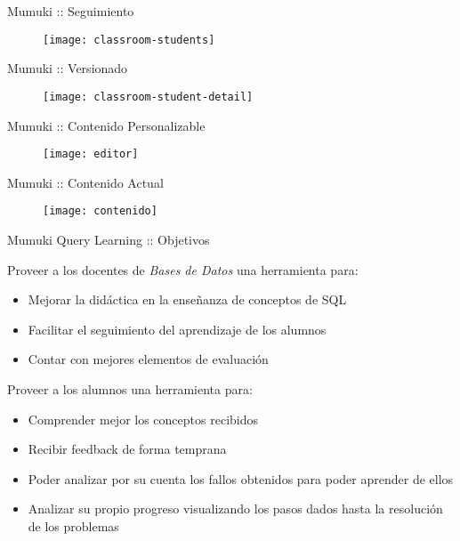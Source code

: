 \documentclass{beamer}
\begin{document}
\begin{frame}{Mumuki :: Seguimiento}
    \begin{figure}[h]
        \texttt{[image: classroom-students]}
    \end{figure}
\end{frame}


\begin{frame}{Mumuki :: Versionado}
    \begin{figure}[h]
        \texttt{[image: classroom-student-detail]}
    \end{figure}
\end{frame}


\begin{frame}{Mumuki :: Contenido Personalizable}
    \begin{figure}[h]
        \texttt{[image: editor]}
    \end{figure}
\end{frame}


\begin{frame}{Mumuki :: Contenido Actual}
    \begin{figure}[h]
        \texttt{[image: contenido]}
    \end{figure}
\end{frame}


\begin{frame}{Mumuki Query Learning :: Objetivos}

    Proveer a los docentes de \textit{Bases de Datos} una herramienta para:

    \begin{itemize}
        \item Mejorar la didáctica en la enseñanza de conceptos de SQL
        \item Facilitar el seguimiento del aprendizaje de los alumnos
        \item Contar con mejores elementos de evaluación
    \end{itemize}

    \vspace{1em}

    Proveer a los alumnos una herramienta para:

    \begin{itemize}
        \item Comprender mejor los conceptos recibidos
        \item Recibir feedback de forma temprana
        \item Poder analizar por su cuenta los fallos obtenidos para poder aprender de ellos
        \item Analizar su propio progreso visualizando los pasos dados hasta la resolución de los problemas
    \end{itemize}
\end{frame}
\end{document}
